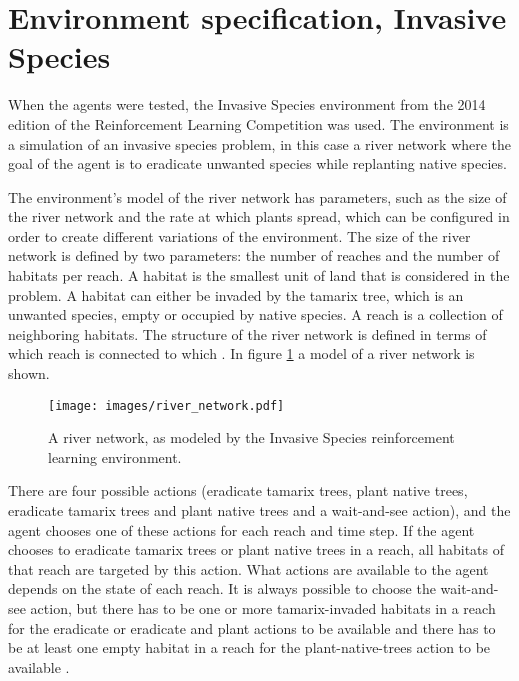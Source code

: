 \section{Environment specification, Invasive Species}
\label{sec:experiment_env}

When the agents were tested, the Invasive Species environment from the 2014 edition of
the Reinforcement Learning Competition was used. The environment is a
simulation of an invasive species problem, in this case a river network where the goal of the agent is to eradicate unwanted species
while replanting native species. 

The environment's model of the river network has parameters, such as the size
of the river network and the rate at which plants spread, which can be
configured in order to create different variations of the environment.  The
size of the river network is defined by two parameters: the number of reaches
and the number of habitats per reach. A habitat is the smallest unit of land
that is considered in the problem. A habitat can either be invaded by the
tamarix tree, which is an unwanted species, empty or occupied by native species. A
reach is a collection of neighboring habitats. The structure of the river
network is defined in terms of which reach is connected to which
\parencite{invasiveSpecis2014:Online}. In figure \ref{fig:river} a model of a
river network is shown.

\begin{figure}[ht]
\centering
\texttt{[image: images/river\_network.pdf]}
\caption{A river network, as modeled by the Invasive Species reinforcement learning environment.}
\label{fig:river}
\end{figure}

There are four possible actions (eradicate tamarix trees, plant native trees,
eradicate tamarix trees and plant native trees and a wait-and-see action),
and the agent chooses one of these actions for each reach and time step. If the 
agent chooses to eradicate tamarix trees or plant native trees in a reach, 
all habitats of that reach are targeted by this action. What
actions are available to the agent depends on the state of each reach. It is
always possible to choose the wait-and-see action, but there has to be one
or more tamarix-invaded habitats in a reach for the eradicate or eradicate and
plant actions to be available and there has to be at least one empty habitat in
a reach for the plant-native-trees action to be available
\parencite{invasiveSpecis2014:Online}.  
